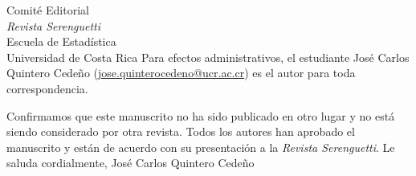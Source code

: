 \documentclass[11pt]{letter}
\begin{document}
\begin{letter}{Comité Editorial\\ \textit{Revista Serenguetti}\\ Escuela de Estadística\\ Universidad de Costa Rica}
Para efectos administrativos, el estudiante José Carlos Quintero Cedeño (\href{mailto:jose.quinterocedeno@ucr.ac.cr}{jose.quinterocedeno@ucr.ac.cr}) es el autor para toda correspondencia.

Confirmamos que este manuscrito no ha sido publicado en otro lugar y no está siendo considerado por otra revista. Todos los autores han aprobado el manuscrito y están de acuerdo con su presentación a la \textit{Revista Serenguetti}.
\vfill
{Le saluda cordialmente,}
\vfill
José Carlos Quintero Cedeño

\end{letter}
\end{document}
